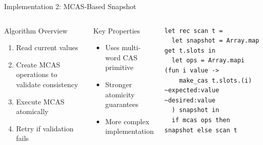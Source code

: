 \documentclass[aspectratio=169]{beamer}
\begin{document}
\begin{frame}{Implementation 2: MCAS-Based Snapshot}
    \begin{columns}[c]
        \begin{block}{Algorithm Overview}
            \begin{enumerate}
                \item Read current values
                \item Create MCAS operations to validate consistency
                \item Execute MCAS atomically
                \item Retry if validation fails
            \end{enumerate}
        \end{block}

        \vspace{0.3cm}
        \begin{block}{Key Properties}
            \begin{itemize}
                \item Uses multi-word CAS primitive
                \item Stronger atomicity guarantees
                \item More complex implementation
            \end{itemize}
        \end{block}

        \begin{lstlisting}[caption=MCAS-Based Scan]
let rec scan t =
  let snapshot = Array.map get t.slots in
  let ops = Array.mapi (fun i value ->
    make_cas t.slots.(i) ~expected:value ~desired:value
  ) snapshot in
  if mcas ops then snapshot else scan t
        \end{lstlisting}
    \end{columns}
\end{frame}
\end{document}
